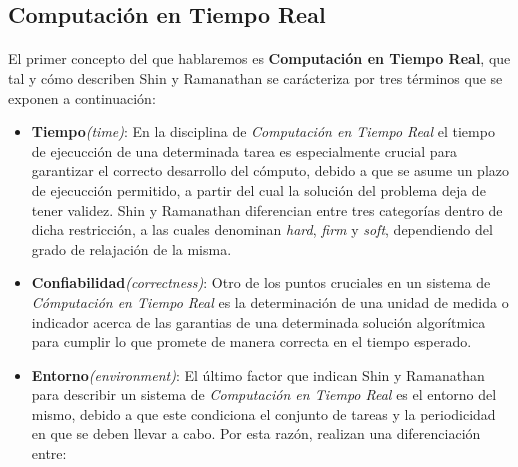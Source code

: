 \documentclass{subfiles}
\begin{document}
      \subsection{Computación en Tiempo Real}
      \label{sec:realtime_computing}
        \paragraph{}
        El primer concepto del que hablaremos es \textbf{Computación en Tiempo Real}, que tal y cómo describen Shin y Ramanathan \cite{259423} se carácteriza por tres términos que se exponen a continuación:

        \begin{itemize}

          \item \textbf{Tiempo}\emph{(time)}: En la disciplina de \emph{Computación en Tiempo Real} el tiempo de ejecucción de una determinada tarea es especialmente crucial para garantizar el correcto desarrollo del cómputo, debido a que se asume un plazo de ejecucción permitido, a partir del cual la solución del problema deja de tener validez. Shin y Ramanathan\cite{259423} diferencian entre tres categorías dentro de dicha restricción, a las cuales denominan \emph{hard}, \emph{firm} y \emph{soft}, dependiendo del grado de relajación de la misma.

          \item \textbf{Confiabilidad}\emph{(correctness)}: Otro de los puntos cruciales en un sistema de \emph{Cómputación en Tiempo Real} es la determinación de una unidad de medida o indicador acerca de las garantias de una determinada solución algorítmica para cumplir lo que promete de manera correcta en el tiempo esperado.

          \item \textbf{Entorno}\emph{(environment)}: El último factor que indican Shin y Ramanathan\cite{259423} para describir un sistema de \emph{Computación en Tiempo Real} es el entorno del mismo, debido a que este condiciona el conjunto de tareas y la periodicidad en que se deben llevar a cabo. Por esta razón, realizan una diferenciación entre:

        \end{itemize}
\end{document}
